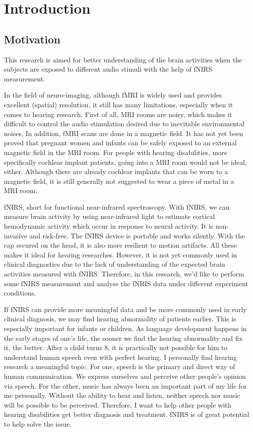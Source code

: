 \chapter{Introduction}

\section{Motivation}
This research is aimed for better understanding of the brain activities when the subjects are exposed to different audio stimuli with the help of fNIRS measurement.

In the field of neuro-imaging, although fMRI is widely used and provides excellent (spatial) resolution, it still has many limitations, especially when it comes to hearing research. First of all, MRI rooms are noisy, which makes it difficult to control the audio stimulation desired due to inevitable environmental noises. In addition, fMRI scans are done in a magnetic field. It has not yet been proved that pregnant women and infants can be safely exposed to an external magnetic field in the MRI room. For people with hearing disabilities, more specifically cochlear implant patients, going into a MRI room would not be ideal, either. Although there are already cochlear implants that can be worn to a magnetic field, it is still generally not suggested to wear a piece of metal in a MRI room.

fNIRS,  short for functional near-infrared spectroscopy. With fNIRS, we can measure brain activity by using near-infrared light to estimate cortical hemodynamic activity which occur in response to neural activity. It is non-invasive and risk-free. The fNIRS device is portable and works silently. With the cap secured on the head, it is also more resilient to motion artifacts. All these makes it ideal for hearing researches. However, it is not yet commonly used in clinical diagnostics due to the lack of understanding of the expected brain activities measured with fNIRS. Therefore, in this research, we'd like to perform some fNIRS measurement and analyse the fNRIS data under different experiment conditions.

If fNIRS can provide more meaningful data and be more commonly used in early clinical diagnosis, we may find hearing abnormality of patients earlier. This is especially important for infants or children. As language development happens in the early stages of one's life, the sooner we find the hearing abnormality and fix it, the better. After a child turns 8, it is practically not possible for him to understand human speech even with perfect hearing. I personally find hearing research a meaningful topic. For one, speech is the primary and direct way of human communication. We express ourselves and perceive other people's opinion via speech. For the other, music has always been an important part of my life for me personally. Without the ability to hear and listen, neither speech nor music will be possible to be perceived. Therefore, I want to help other people with hearing disabilities get better diagnosis and treatment. fNIRS is of great potential to help solve the issue.

